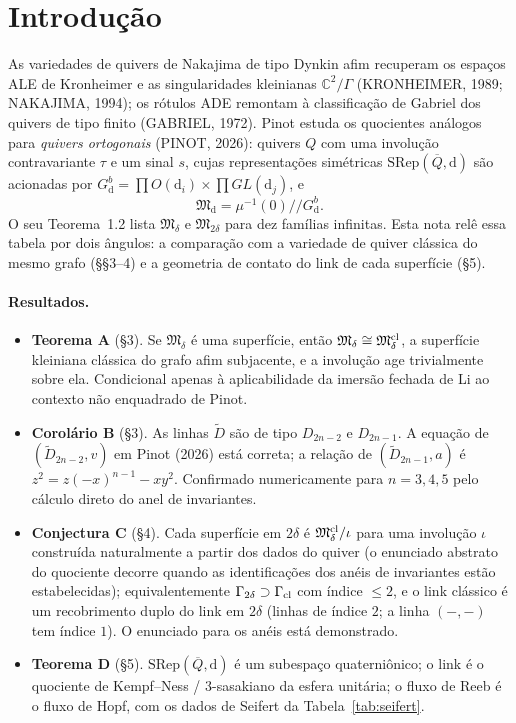 \documentclass[11pt]{article}
\theoremstyle{definition}
\theoremstyle{remark}
\newcommand{\C}{\mathbb{C}}\newcommand{\R}{\mathbb{R}}\newcommand{\Z}{\mathbb{Z}}
\newcommand{\M}{\mathfrak{M}}\newcommand{\Rep}{\mathrm{Rep}}\newcommand{\SRep}{\mathrm{SRep}}
\begin{document}
\section{Introdução}

As variedades de quivers de Nakajima de tipo Dynkin afim recuperam os espaços ALE de Kronheimer e as singularidades kleinianas $\C^2/\Gamma$ (KRONHEIMER, 1989; NAKAJIMA, 1994); os rótulos ADE remontam à classificação de Gabriel dos quivers de tipo finito (GABRIEL, 1972). Pinot estuda os quocientes análogos para \emph{quivers ortogonais} (PINOT, 2026): quivers $Q$ com uma involução contravariante $\tau$ e um sinal $s$, cujas representações simétricas $\SRep(\overline Q,\mathrm d)$ são acionadas por $G^b_{\mathrm d}=\prod O(\mathrm d_i)\times\prod GL(\mathrm d_j)$, e
\[\M_{\mathrm d}=\mu^{-1}(0)/\!/G^b_{\mathrm d}.\]
O seu Teorema~1.2 lista $\M_\delta$ e $\M_{2\delta}$ para dez famílias infinitas. Esta nota relê essa tabela por dois ângulos: a comparação com a variedade de quiver clássica do mesmo grafo (\S\S3--4) e a geometria de contato do link de cada superfície (\S5).

\paragraph{Resultados.}
\begin{itemize}[leftmargin=*]
\item \textbf{Teorema A} (\S3). Se $\M_\delta$ é uma superfície, então $\M_\delta\cong\M_\delta^{\rm cl}$, a superfície kleiniana clássica do grafo afim subjacente, e a involução age trivialmente sobre ela. Condicional apenas à aplicabilidade da imersão fechada de Li ao contexto não enquadrado de Pinot.
\item \textbf{Corolário B} (\S3). As linhas $\widetilde D$ são de tipo $D_{2n-2}$ e $D_{2n-1}$. A equação de $(\widetilde D_{2n-2},v)$ em Pinot (2026) está correta; a relação de $(\widetilde D_{2n-1},a)$ é $z^2=z(-x)^{n-1}-xy^2$. Confirmado numericamente para $n=3,4,5$ pelo cálculo direto do anel de invariantes.
\item \textbf{Conjectura C} (\S4). Cada superfície em $2\delta$ é $\M^{\rm cl}_\delta/\iota$ para uma involução $\iota$ construída naturalmente a partir dos dados do quiver (o enunciado abstrato do quociente decorre quando as identificações dos anéis de invariantes estão estabelecidas); equivalentemente $\Gamma_{2\delta}\supset\Gamma_{\rm cl}$ com índice $\le2$, e o link clássico é um recobrimento duplo do link em $2\delta$ (linhas de índice $2$; a linha $(-,-)$ tem índice $1$). O enunciado para os anéis está demonstrado.
\item \textbf{Teorema D} (\S5). $\SRep(\overline Q,\mathrm d)$ é um subespaço quaterniônico; o link é o quociente de Kempf--Ness / $3$-sasakiano da esfera unitária; o fluxo de Reeb é o fluxo de Hopf, com os dados de Seifert da Tabela~\ref{tab:seifert}.
\end{itemize}
\end{document}
